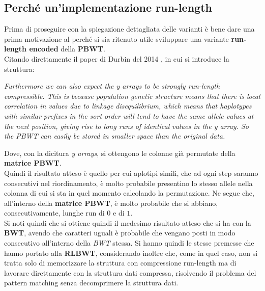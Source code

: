 \subsection{Perché un'implementazione run-length}
Prima di proseguire con la spiegazione dettagliata delle varianti è bene dare
una prima motivazione al perché si sia ritenuto utile sviluppare una variante
\textbf{run-length encoded} della \textbf{PBWT}.\\
Citando direttamente il paper di Durbin del 2014 \cite{pbwt}, in cui si
introduce la struttura:
\begin{center}
  \textit{Furthermore we can also expect the y arrays to be strongly run-length
    compressible. This is because population genetic structure means that there
    is local correlation in values due to linkage disequilibrium, which means
    that haplotypes with similar prefixes in the sort order will tend to have
    the same allele values at the next position, giving rise to long runs of
    identical values in the y array. So the PBWT can easily be stored in smaller
    space than the original data.} 
\end{center}
Dove, con la dicitura \textit{y arrays}, si ottengono le colonne già permutate
della \textbf{matrice PBWT}.\\
Quindi il risultato atteso è quello per cui aplotipi simili, che ad ogni step
saranno consecutivi nel riordinamento, è molto probabile presentino lo stesso
allele nella colonna di cui si sta in quel momento calcolando la
permutazione. Ne segue che, all'interno della \textbf{matrice PBWT}, è molto
probabile che si abbiano, consecutivamente, lunghe run di $0$ e di $1$.\\
Si noti quindi che si ottiene quindi il medesimo risultato atteso che si ha con
la \textbf{BWT}, avendo che caratteri uguali è probabile che vengano posti in
modo consecutivo all'interno della \textit{BWT} stessa. Si hanno quindi le
stesse premesse che hanno portato alla \textbf{RLBWT}, considerando inoltre che,
come in quel caso, non si tratta solo di memorizzare la struttura con
compressione run-length ma di lavorare direttamente con la struttura dati
compressa, risolvendo il problema del pattern matching senza decomprimere la
struttura dati.